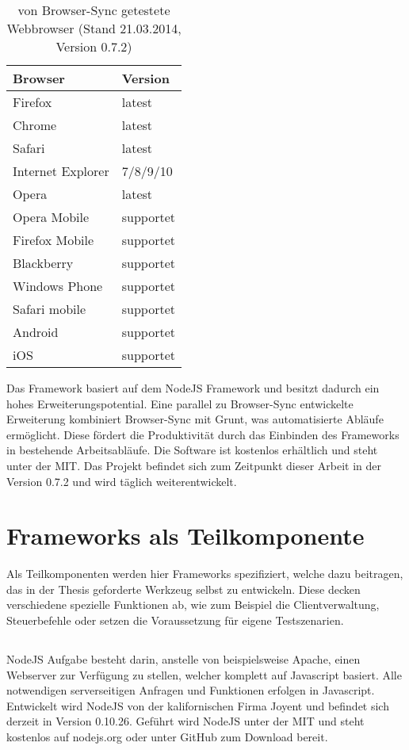 		\begin{table}[H]
 		\centering
			\begin{tabular}{| p{5cm} | p{5cm} |}
			
			\hline
				Browser 	& 	Version\\
			\hline
			\hline
				Firefox	&	latest\\
				Chrome	&	latest\\
				Safari	&	latest\\
				Internet Explorer	&	7/8/9/10\\
				Opera	&	latest\\
				Opera Mobile	&	supportet\\
				Firefox Mobile	&	supportet\\
				Blackberry	&	supportet\\
				Windows Phone	&	supportet\\
				Safari mobile	&	supportet\\	
				Android	&	supportet\\
				iOS		&	supportet\\
				\hline
				\end{tabular}
			\caption{von Browser-Sync getestete \Gls{Webbrowser} (Stand 21.03.2014, Version 0.7.2)}
	\end{table}
	
	Das \Gls{Framework} basiert auf dem \gls{NodeJS} \Gls{Framework} und besitzt dadurch ein hohes Erweiterungspotential. Eine parallel zu Browser-Sync entwickelte Erweiterung kombiniert Browser-Sync mit \Gls{Grunt}, was automatisierte Abläufe ermöglicht. Diese fördert die Produktivität durch das Einbinden des \Gls{Framework}s in bestehende Arbeitsabläufe. Die Software ist kostenlos erhältlich und steht unter der \Gls{MIT}. Das Projekt befindet sich zum Zeitpunkt dieser Arbeit in der Version 0.7.2 und wird täglich weiterentwickelt.

\pagebreak
\section{Frameworks als Teilkomponente}
	Als Teilkomponenten werden hier \Gls{Framework}s spezifiziert, welche dazu beitragen, das in der Thesis geforderte Werkzeug selbst zu entwickeln. Diese decken verschiedene spezielle Funktionen ab, wie zum Beispiel die Clientverwaltung, Steuerbefehle oder setzen die Voraussetzung für eigene \Gls{Test}szenarien.
	
	\subsection{}
	\gls{NodeJS} Aufgabe besteht darin, anstelle von beispielsweise \Gls{Apache}, einen Webserver zur Verfügung zu stellen, welcher komplett auf \Gls{Javascript} basiert. Alle notwendigen serverseitigen Anfragen und Funktionen erfolgen in \Gls{Javascript}. Entwickelt wird \gls{NodeJS} von der kalifornischen Firma Joyent und befindet sich derzeit in Version 0.10.26. Geführt wird \gls{NodeJS} unter der \Gls{MIT} und steht kostenlos auf nodejs.org oder unter GitHub zum Download bereit.
	
